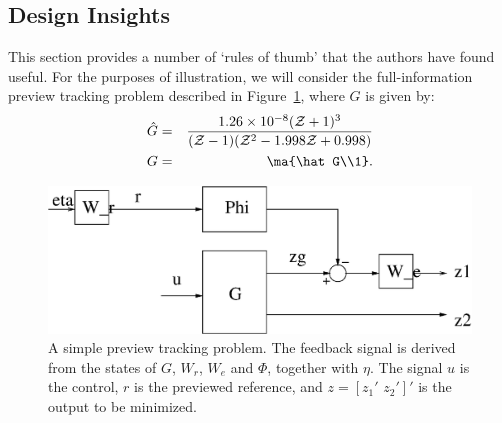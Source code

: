 \subsection{Design Insights}
This section provides a number of `rules of thumb' that the authors have found useful. For the purposes of illustration, we will consider the full-information preview tracking problem described in Figure~\ref{fig:PrevTrackSysFI}, where $G$ is given by:
\begin{eqnarray}
\hat G&=&\frac{1.26 \times 10^{-8} (\z+1)^3}{
		(\z-1) (\z^2  - 1.998\z + 0.998)} \nonumber \\
G&=&\ma{\hat G\\1}. \label{example}
\end{eqnarray}
\begin{figure}
\begin{center}
\includegraphics[width=0.75\columnwidth]{./diags/PrevTrackSysFI.eps}
\end{center}
\caption{A simple preview tracking problem. The feedback signal is derived from the states of $G$, $W_r$, $W_e$ and $\Phi$, together with $\eta$. The signal $u$ is the control, $r$ is the previewed reference, and $z=\left[z_1'\,\,z_2'\right]'$ is the output to be minimized. \label{fig:PrevTrackSysFI}}
\end{figure}

